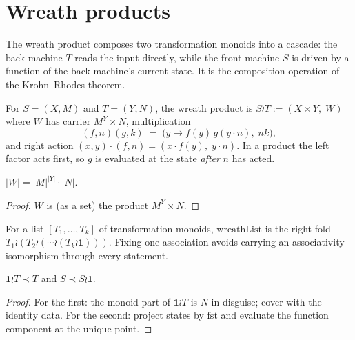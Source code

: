\chapter{Wreath products}\label{ch:wreath}

The wreath product composes two transformation monoids into a cascade:
the back machine $T$ reads the input directly, while the front machine
$S$ is driven by a function of the back machine's current state. It is
the composition operation of the Krohn--Rhodes theorem.

\begin{definition}\label{def:wreath}
  \leanok
  For $S = (X, M)$ and $T = (Y, N)$, the wreath product is
  $S \wr T := (X \times Y,\; W)$ where $W$ has carrier $M^Y \times N$,
  multiplication
  \[ (f, n)(g, k) \;=\; \bigl(y \mapsto f(y)\,g(y \cdot n),\; nk\bigr), \]
  and right action $(x, y) \cdot (f, n) = (x \cdot f(y),\; y \cdot n)$.
  In a product the left factor acts first, so $g$ is evaluated at the
  state \emph{after} $n$ has acted.
\end{definition}

\begin{lemma}[Cardinality]\label{lem:wreath-card}
  \leanok{}
  $|W| = |M|^{|Y|}\cdot|N|$.
\end{lemma}
\begin{proof}
  \leanok
  $W$ is (as a set) the product $M^Y \times N$.
\end{proof}

\begin{definition}\label{def:wreathList}
  \leanok{}
  For a list $[T_1, \dots, T_k]$ of transformation monoids,
  $\mathrm{wreathList}$ is the right fold
  $T_1 \wr (T_2 \wr (\cdots \wr (T_k \wr \mathbf{1})))$.
  Fixing one association avoids carrying an associativity isomorphism
  through every statement.
\end{definition}

\begin{lemma}\label{lem:wreath-trivial}
  \leanok
  $\mathbf{1} \wr T \prec T$ and $S \prec S \wr \mathbf{1}$.
\end{lemma}
\begin{proof}
  \leanok
  For the first: the monoid part of $\mathbf{1} \wr T$ is $N$ in
  disguise; cover with the identity data. For the second: project
  states by $\mathrm{fst}$ and evaluate the function component at the
  unique point.
\end{proof}

